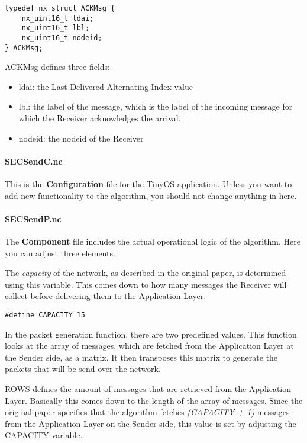 \begin{verbatim}
typedef nx_struct ACKMsg {
    nx_uint16_t ldai;
    nx_uint16_t lbl;
    nx_uint16_t nodeid;
} ACKMsg;
\end{verbatim}

ACKMsg defines three fields:

\begin{itemize}
\itemsep1pt\parskip0pt
\item
  ldai: the Last Delivered Alternating Index value
\item
  lbl: the label of the message, which is the label of the incoming
  message for which the Receiver acknowledges the arrival.
\item
  nodeid: the nodeid of the Receiver
\end{itemize}

\paragraph{SECSendC.nc}\label{secsendc.nc}

This is the \textbf{Configuration} file for the TinyOS application.
Unless you want to add new functionality to the algorithm, you should
not change anything in here.

\paragraph{SECSendP.nc}\label{secsendp.nc}

The \textbf{Component} file includes the actual operational logic of the
algorithm. Here you can adjust three elements.

The \emph{capacity} of the network, as described in the original paper,
is determined using this variable. This comes down to how many messages
the Receiver will collect before delivering them to the Application
Layer.

\texttt{\#define CAPACITY 15}

In the packet generation function, there are two predefined values. This
function looks at the array of messages, which are fetched from the
Application Layer at the Sender side, as a matrix. It then transposes
this matrix to generate the packets that will be send over the network.

ROWS defines the amount of messages that are retrieved from the
Application Layer. Basically this comes down to the length of the array
of messages. Since the original paper specifies that the algorithm
fetches \emph{(CAPACITY + 1)} messages from the Application Layer on the
Sender side, this value is set by adjusting the CAPACITY variable.

